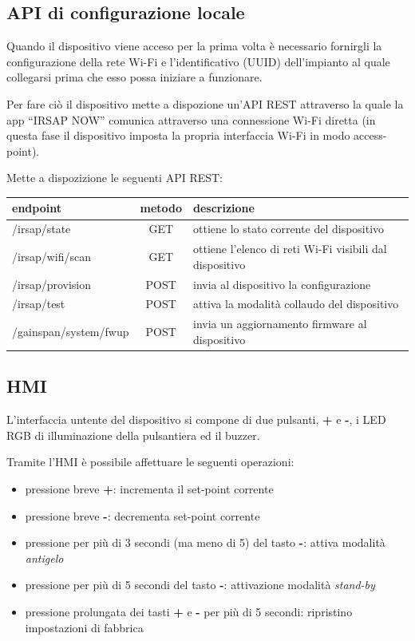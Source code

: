 \documentclass[12pt,a4paper,twoside,titlepage]{book}
\begin{document}
\subsection{API di configurazione locale}

Quando il dispositivo viene acceso per la prima volta è necessario fornirgli la
configurazione della rete Wi-Fi e l'identificativo (UUID) dell'impianto al quale
collegarsi prima che esso possa iniziare a funzionare.

Per fare ciò il dispositivo mette a dispozione un'API REST attraverso la quale la
app ``IRSAP NOW'' comunica attraverso una connessione Wi-Fi diretta (in questa fase
il dispositivo imposta la propria interfaccia Wi-Fi in modo access-point).

Mette a dispozizione le seguenti API REST:

\begin{center}
\begin{tabular}{| l | c | p{6cm} |}
    \hline \textbf{endpoint} & \textbf{metodo} & \textbf{descrizione} \\
    \hline /irsap/state & GET & ottiene lo stato corrente del dispositivo \\
    \hline /irsap/wifi/scan & GET & ottiene l'elenco di reti Wi-Fi visibili dal dispositivo \\
    \hline /irsap/provision & POST & invia al dispositivo la configurazione \\
    \hline /irsap/test & POST & attiva la modalità collaudo del dispositivo \\
    \hline /gainspan/system/fwup & POST & invia un aggiornamento firmware al dispositivo \\
    \hline
\end{tabular}
\end{center}

\subsection{HMI}

L'interfaccia untente del dispositivo si compone di due pulsanti, \textbf{+} e \textbf{-},
i LED RGB di illuminazione della pulsantiera ed il buzzer.

Tramite l'HMI è possibile affettuare le seguenti operazioni:

\begin{itemize}
    \item pressione breve \textbf{+}: incrementa il set-point corrente
    \item pressione breve \textbf{-}: decrementa set-point corrente
    \item pressione per più di 3 secondi (ma meno di 5) del tasto \textbf{-}:
        attiva modalità \textit{antigelo}
    \item pressione per più di 5 secondi del tasto \textbf{-}: attivazione modalità
        \textit{stand-by}
    \item pressione prolungata dei tasti \textbf{+} e \textbf{-} per più di 5 secondi:
        ripristino impostazioni di fabbrica
\end{itemize}
\end{document}
